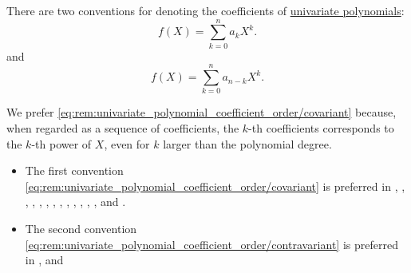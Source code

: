 \begin{remark}\label{rem:univariate_polynomial_coefficient_order}
  There are two conventions for denoting the coefficients of \hyperref[def:univariate_polynomial]{univariate polynomials}:
  \begin{equation}\label{eq:rem:univariate_polynomial_coefficient_order/covariant}
    f(X) = \sum_{k=0}^n a_k X^k.
  \end{equation}
  and
  \begin{equation}\label{eq:rem:univariate_polynomial_coefficient_order/contravariant}
    f(X) = \sum_{k=0}^n a_{n-k} X^k.
  \end{equation}

  We prefer \eqref{eq:rem:univariate_polynomial_coefficient_order/covariant} because, when regarded as a sequence of coefficients, the \( k \)-th coefficients corresponds to the \( k \)-th power of \( X \), even for \( k \) larger than the polynomial degree.

  \begin{itemize}
    \item The first convention \eqref{eq:rem:univariate_polynomial_coefficient_order/covariant} is preferred in
    \cite[97]{Lang2002Algebra},
    \cite[44]{Rotman2015AdvancedModernAlgebraPart1},
    \cite[9]{Knapp2016BasicAlgebra},
    \cite[def. III.1.19]{Aluffi2009Algebra},
    \cite[120]{Jacobson1985BasicAlgebraI},
    \cite[10]{FriedbergInselSpence2018LinearAlgebra},
    \cite[28]{Ahlfors1979ComplexAnalysis},
    \cite[\S 8.24]{Schechter1997AnalysisHandbook},
    \cite[96]{Маркушевич1967АналитическиеФункцииТом1},
    \cite[93]{Винберг2014КурсАлгебры},
    \cite[180]{Кострикин2000АлгебраЧасть1},
    \cite[118]{Тыртышников2017ОсновыАлгебры},
    \cite[132]{Окунев1951КольцоМногочленов},
    \cite[22]{ГеновМиховскиМоллов1991Алгебра} and
    \cite[120]{ИлинСадовничиСендов1984АнализТом1}.

    \item The second convention \eqref{eq:rem:univariate_polynomial_coefficient_order/contravariant} is preferred in
    \cite[131]{Курош1968КурсВысшейАлгебры},
    \cite[1]{Обрешков1962ВисшаАлгебра} and
    \cite[1]{Боянов2008ЧислениМетоди}
  \end{itemize}
\end{remark}

